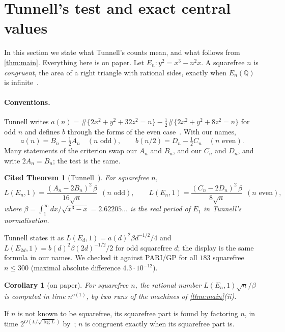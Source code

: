 \documentclass[10pt]{amsart}
\theoremstyle{plain}
\newtheorem{corollary}[theorem]{Corollary}
\newtheorem{citedtheorem}[theorem]{Cited Theorem}
\theoremstyle{definition}
\theoremstyle{remark}
\numberwithin{equation}{section}
\newcommand{\Q}{\mathbb{Q}}
\newcommand{\rate}{2^{O(L/\sqrt{\log L})}}
\begin{document}
\section{Tunnell's test and exact central values}\label{sec:tunnell}

In this section we state what Tunnell's counts mean, and what follows from \cref{thm:main}. Everything here
is on paper. Let $E_n:y^2=x^3-n^2x$. A squarefree $n$ is \emph{congruent}, the area of a right triangle with
rational sides, exactly when $E_n(\Q)$ is infinite~\cite[p.~324]{Tun83}.

\paragraph{Conventions.} Tunnell writes $a(n)=\#\{2x^2+y^2+32z^2=n\}-\frac12\#\{2x^2+y^2+8z^2=n\}$ for odd $n$
and defines $b$ through the forms of the even case~\cite[pp.~325, 328]{Tun83}. With our names,
\[
  a(n)=B_n-\tfrac12A_n\quad(n\text{ odd}),\qquad b(n/2)=D_n-\tfrac12C_n\quad(n\text{ even}).
\]
Many statements of the criterion swap our $A_n$ and $B_n$, and our $C_n$ and $D_n$, and write $2A_n=B_n$; the
test is the same.

\begin{citedtheorem}[Tunnell~{\cite[Theorem~3]{Tun83}}]\label{cit:tunnell}
For squarefree $n$,
\[
  L(E_n,1)=\frac{(A_n-2B_n)^2\,\beta}{16\sqrt n}\ \ (n\text{ odd}),\qquad
  L(E_n,1)=\frac{(C_n-2D_n)^2\,\beta}{8\sqrt n}\ \ (n\text{ even}),
\]
where $\beta=\int_1^\infty dx/\sqrt{x^3-x}=2.62205\ldots$ is the real period of $E_1$ in Tunnell's
normalisation.
\end{citedtheorem}

\noindent Tunnell states it as $L(E_d,1)=a(d)^2\beta d^{-1/2}/4$ and $L(E_{2d},1)=b(d)^2\beta(2d)^{-1/2}/2$
for odd squarefree $d$; the display is the same formula in our names. We checked it against PARI/GP for all
$183$ squarefree $n\le300$ (maximal absolute difference $4.3\cdot10^{-12}$).

\begin{corollary}[on paper]\label{cor:lvalue}
For squarefree $n$, the rational number $L(E_n,1)\sqrt n/\beta$ is computed in time $n^{o(1)}$, by two runs of
the machines of \cref{thm:main}(ii).
\end{corollary}

\noindent If $n$ is not known to be squarefree, its squarefree part is found by factoring $n$, in time
$\rate$ by~\cite{Shu26,TulFac26}; $n$ is congruent exactly when its squarefree part is.
\end{document}
